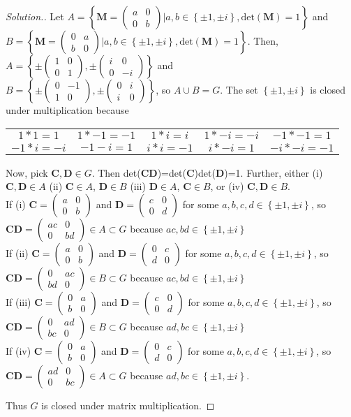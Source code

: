 \documentclass{article}
\newcommand{\set}[1]{\left\{#1\right\}}
\newcommand{\mat}[4]{\left( \begin{array}{cc} #1 & #2 \\ #3 & #4  \end{array} \right)}
\begin{document}
\begin{proof}[Solution.]
Let $A=\set{\textbf{M}=\mat{a}{0}{0}{b}|a,b\in\set{\pm1,\pm i}, \text{det}(\textbf{M})=1}$ and\\
$B=\set{\textbf{M}=\mat{0}{a}{b}{0}|a,b\in\set{\pm1,\pm i}, \text{det}(\textbf{M})=1} $.  Then, $A=\set{\pm \mat{1}{0}{0}{1}, \pm \mat{i}{0}{0}{-i}}$ and\\
$B=\set{\pm \mat{0}{-1}{1}{0} ,\pm \mat{0}{i}{i}{0}}$, so $A\cup B= G$. The set $\set{\pm1,\pm i}$ is closed under multiplication because 
\begin{center}
\begin{tabular}{c c c c c}
$1*1=1 $&$1*-1=-1 $&$1*i=i $&$1*-i=-i $&$-1*-1=1$\\
$-1*i=-i$&$-1-i=1$&$i*i=-1$&$i*-i=1$&$-i*-i=-1$
\end{tabular}
\end{center}
Now, pick $\textbf{C},\textbf{D}\in G$. Then det($\textbf{C}\textbf{D}$)=det($\textbf{C}$)det($\textbf{D}$)=1. Further, either (i) $\textbf{C},\textbf{D}\in A$ (ii) $\textbf{C}\in A$, $\textbf{D}\in B$ (iii) $\textbf{D}\in A$, $\textbf{C}\in B$, or (iv) $\textbf{C},\textbf{D}\in B$. \\
    \indent If (i) $\textbf{C}=\mat{a}{0}{0}{b}$ and $\textbf{D}=\mat{c}{0}{0}{d}$ for some $a,b,c,d\in \set{\pm1,\pm i}$, so $\textbf{C}\textbf{D}=\mat{ac}{0}{0}{bd}\in A\subset G$ because $ac,bd \in \set{\pm1,\pm i}$ \\
    
    \indent If (ii) $\textbf{C}=\mat{a}{0}{0}{b}$ and $\textbf{D}=\mat{0}{c}{d}{0}$ for some $a,b,c,d\in \set{\pm1,\pm i}$, so $\textbf{C}\textbf{D}=\mat{0}{ac}{bd}{0}\in B\subset G$ because $ac,bd \in \set{\pm1,\pm i}$\\
    
    \indent If (iii) $\textbf{C}=\mat{0}{a}{b}{0}$ and $\textbf{D}=\mat{c}{0}{0}{d}$ for some $a,b,c,d\in \set{\pm1,\pm i}$, so $\textbf{C}\textbf{D}=\mat{0}{ad}{bc}{0}\in B\subset G$ because $ad,bc \in \set{\pm1,\pm i}$\\
    
    \indent If (iv) $\textbf{C}=\mat{0}{a}{b}{0}$ and $\textbf{D}=\mat{0}{c}{d}{0}$ for some $a,b,c,d\in \set{\pm1,\pm i}$, so $\textbf{C}\textbf{D}=\mat{ad}{0}{0}{bc}\in A\subset G$ because $ad,bc\in \set{\pm1,\pm i}$.
    
Thus $G$ is closed under matrix multiplication.


\end{proof}
\end{document}
